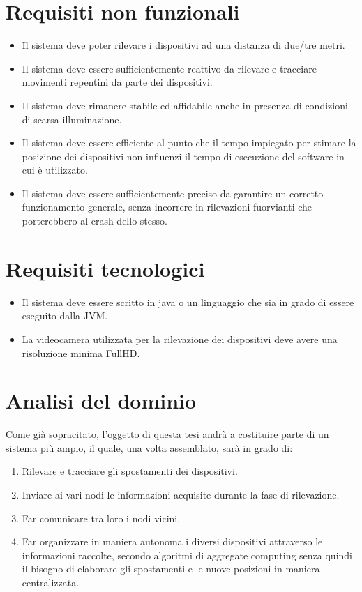 \documentclass[12pt,a4paper,openright,twoside]{book}
\begin{document}
\section{Requisiti non funzionali} \label{sec:requisiti_non_funzionali}
\begin{itemize}
	\item Il sistema deve poter rilevare i dispositivi ad una distanza di due/tre metri.
	\item Il sistema deve essere sufficientemente reattivo da rilevare e tracciare movimenti repentini da parte dei dispositivi.
	\item Il sistema deve rimanere stabile ed affidabile anche in presenza di condizioni di scarsa illuminazione.
	\item Il sistema deve essere efficiente al punto che il tempo impiegato per stimare la posizione dei dispositivi non influenzi il tempo di esecuzione del software in cui è utilizzato.
	\item Il sistema deve essere sufficientemente preciso da garantire un corretto funzionamento generale, senza incorrere in rilevazioni fuorvianti che porterebbero al crash dello stesso.
\end{itemize}
\section{Requisiti tecnologici}
\begin{itemize}
	\item Il sistema deve essere scritto in java o un linguaggio che sia in grado di essere eseguito dalla JVM.
	\item La videocamera utilizzata per la rilevazione dei dispositivi deve avere una risoluzione minima \gls{FullHD}.
\end{itemize}
\section{Analisi del dominio}
Come già sopracitato, l’oggetto di questa tesi andrà a costituire parte di un sistema più ampio, il quale, una volta assemblato, sarà in grado di:
\begin{enumerate}
	\item \underline{Rilevare e tracciare gli spostamenti dei dispositivi.}
	\item Inviare ai vari nodi le informazioni acquisite durante la fase di rilevazione.
	\item Far comunicare tra loro i nodi vicini.
	\item Far organizzare in maniera autonoma i diversi dispositivi attraverso le informazioni raccolte, secondo algoritmi di aggregate computing senza quindi il bisogno di elaborare gli spostamenti e le nuove posizioni in maniera centralizzata.
\end{enumerate}
\end{document}
